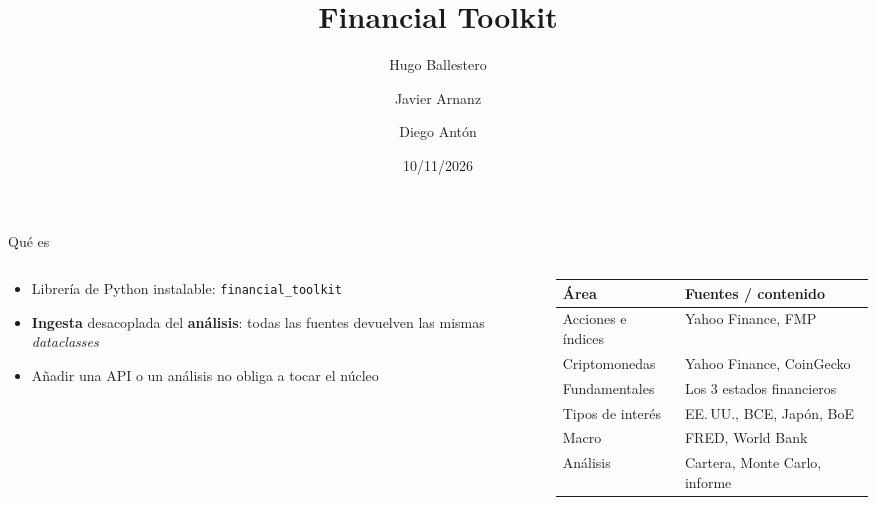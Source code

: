 \documentclass[aspectratio=169,10pt]{beamer}
\title{Financial Toolkit}
\author{Hugo Ballestero \and Javier Arnanz \and Diego Antón}
\institute{Máster MIAX · BME Institute · Taller 1}
\date{10/11/2026}
\newcommand{\code}[1]{\texttt{\color{accent}#1}}
\begin{document}
\begin{frame}[plain]
  \titlepage
\end{frame}

\begin{frame}{Qué es}
  \begin{columns}[T]
    \begin{column}{0.36\textwidth}
      \begin{itemize}
        \item Librería de Python instalable: \code{financial\_toolkit}
        \item \textbf{Ingesta} desacoplada del \textbf{análisis}: todas las fuentes devuelven las mismas \emph{dataclasses}
        \item Añadir una API o un análisis no obliga a tocar el núcleo
      \end{itemize}
    \end{column}
    \begin{column}{0.60\textwidth}
      \small
      \begin{tabular}{@{}ll@{}}
        \toprule
        \textbf{Área} & \textbf{Fuentes / contenido} \\
        \midrule
        Acciones e índices & Yahoo Finance, FMP \\
        Criptomonedas      & Yahoo Finance, CoinGecko \\
        Fundamentales      & Los 3 estados financieros \\
        Tipos de interés   & EE.\,UU., BCE, Japón, BoE \\
        Macro              & FRED, World Bank \\
        Análisis           & Cartera, Monte Carlo, informe \\
        \bottomrule
      \end{tabular}
    \end{column}
  \end{columns}
\end{frame}
\end{document}
